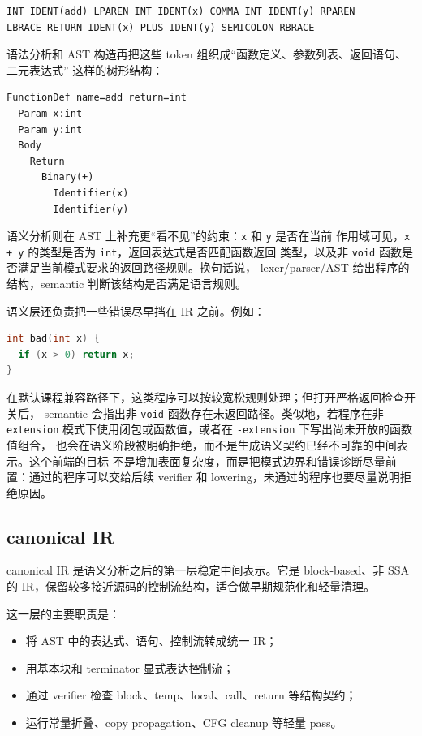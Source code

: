 \documentclass[UTF8,a4paper,11pt]{ctexart}
\begin{document}
\begin{lstlisting}[language={}]
INT IDENT(add) LPAREN INT IDENT(x) COMMA INT IDENT(y) RPAREN
LBRACE RETURN IDENT(x) PLUS IDENT(y) SEMICOLON RBRACE
\end{lstlisting}

语法分析和 AST 构造再把这些 token 组织成“函数定义、参数列表、返回语句、二元表达式”
这样的树形结构：

\begin{lstlisting}[language={}]
FunctionDef name=add return=int
  Param x:int
  Param y:int
  Body
    Return
      Binary(+)
        Identifier(x)
        Identifier(y)
\end{lstlisting}

语义分析则在 AST 上补充更“看不见”的约束：\texttt{x} 和 \texttt{y} 是否在当前
作用域可见，\texttt{x + y} 的类型是否为 \texttt{int}，返回表达式是否匹配函数返回
类型，以及非 \texttt{void} 函数是否满足当前模式要求的返回路径规则。换句话说，
lexer/parser/AST 给出程序的结构，semantic 判断该结构是否满足语言规则。

语义层还负责把一些错误尽早挡在 IR 之前。例如：

\begin{lstlisting}[language=C]
int bad(int x) {
  if (x > 0) return x;
}
\end{lstlisting}

在默认课程兼容路径下，这类程序可以按较宽松规则处理；但打开严格返回检查开关后，
semantic 会指出非 \texttt{void} 函数存在未返回路径。类似地，若程序在非 \texttt{-extension}
模式下使用闭包或函数值，或者在 \texttt{-extension} 下写出尚未开放的函数值组合，
也会在语义阶段被明确拒绝，而不是生成语义契约已经不可靠的中间表示。这个前端的目标
不是增加表面复杂度，而是把模式边界和错误诊断尽量前置：通过的程序可以交给后续
verifier 和 lowering，未通过的程序也要尽量说明拒绝原因。

\subsection{canonical IR}

canonical IR 是语义分析之后的第一层稳定中间表示。它是 block-based、非 SSA
的 IR，保留较多接近源码的控制流结构，适合做早期规范化和轻量清理。

这一层的主要职责是：

\begin{itemize}
  \item 将 AST 中的表达式、语句、控制流转成统一 IR；
  \item 用基本块和 terminator 显式表达控制流；
  \item 通过 verifier 检查 block、temp、local、call、return 等结构契约；
  \item 运行常量折叠、copy propagation、CFG cleanup 等轻量 pass。
\end{itemize}
\end{document}
